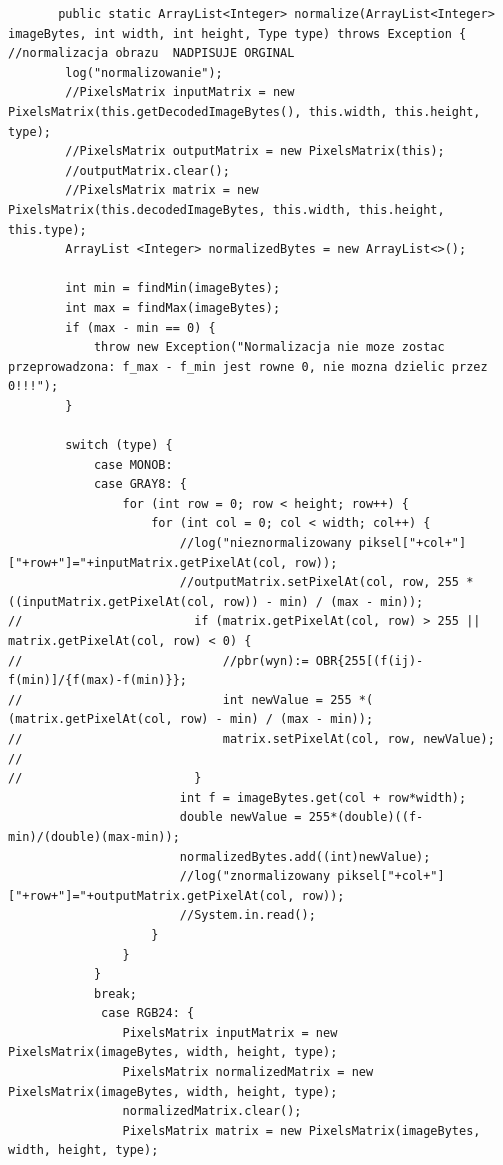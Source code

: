 \documentclass{article}
\begin{document}
	\begin{verbatim}
	   public static ArrayList<Integer> normalize(ArrayList<Integer> imageBytes, int width, int height, Type type) throws Exception {    //normalizacja obrazu  NADPISUJE ORGINAL
        log("normalizowanie");
        //PixelsMatrix inputMatrix = new PixelsMatrix(this.getDecodedImageBytes(), this.width, this.height, type);
        //PixelsMatrix outputMatrix = new PixelsMatrix(this);
        //outputMatrix.clear();
        //PixelsMatrix matrix = new PixelsMatrix(this.decodedImageBytes, this.width, this.height, this.type);
        ArrayList <Integer> normalizedBytes = new ArrayList<>();

        int min = findMin(imageBytes);
        int max = findMax(imageBytes);
        if (max - min == 0) {
            throw new Exception("Normalizacja nie moze zostac przeprowadzona: f_max - f_min jest rowne 0, nie mozna dzielic przez 0!!!");
        }

        switch (type) {
            case MONOB:
            case GRAY8: {
                for (int row = 0; row < height; row++) {
                    for (int col = 0; col < width; col++) {
                        //log("nieznormalizowany piksel["+col+"]["+row+"]="+inputMatrix.getPixelAt(col, row));
                        //outputMatrix.setPixelAt(col, row, 255 * ((inputMatrix.getPixelAt(col, row)) - min) / (max - min));
//                        if (matrix.getPixelAt(col, row) > 255 || matrix.getPixelAt(col, row) < 0) {
//                            //pbr(wyn):= OBR{255[(f(ij)-f(min)]/{f(max)-f(min)}}; 
//                            int newValue = 255 *( (matrix.getPixelAt(col, row) - min) / (max - min));
//                            matrix.setPixelAt(col, row, newValue);
//                            
//                        }
                        int f = imageBytes.get(col + row*width);
                        double newValue = 255*(double)((f-min)/(double)(max-min));
                        normalizedBytes.add((int)newValue);
                        //log("znormalizowany piksel["+col+"]["+row+"]="+outputMatrix.getPixelAt(col, row));
                        //System.in.read();
                    }
                }
            }
            break;
             case RGB24: {
                PixelsMatrix inputMatrix = new PixelsMatrix(imageBytes, width, height, type);
                PixelsMatrix normalizedMatrix = new PixelsMatrix(imageBytes, width, height, type);
                normalizedMatrix.clear();
                PixelsMatrix matrix = new PixelsMatrix(imageBytes, width, height, type);
                

\end{verbatim}
\end{document}
